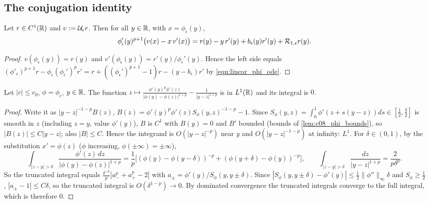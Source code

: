 \subsection{The conjugation identity}

\begin{lemma}
  \label{lem:c08_conj_local}
  Let $r\in C^1(\mathbb{R})$ and $v:=\mathcal{U}_\epsilon r$. Then for all $y\in\mathbb{R}$, with $x=\phi_\epsilon(y)$,
  \[
    \phi_\epsilon'(y)^{p+1}\bigl(v(x)-x\,v'(x)\bigr)=r(y)-y\,r'(y)+b_\epsilon(y)r'(y)+\mathcal{R}_{1,\epsilon}r(y).
  \]
\end{lemma}
\begin{proof}
  $v(\phi_\epsilon(y))=r(y)$ and $v'(\phi_\epsilon(y))=r'(y)/\phi_\epsilon'(y)$. Hence the left side equals
  $(\phi'_\epsilon)^{p+1}r-\phi_\epsilon(\phi_\epsilon')^pr'=r+((\phi_\epsilon')^{p+1}-1)r-(y-b_\epsilon)r'$ by
  \eqref{eqn:linear_phi_ode}.
\end{proof}

\begin{lemma}
  \label{lem:c08_conj_cancellation}
  Let $|c|\le c_0$, $\phi=\phi_c$, $y\in\mathbb{R}$. The function
  $z\mapsto\frac{\phi'(y)^p\phi'(z)}{|\phi(y)-\phi(z)|^{1+p}}-\frac1{|y-z|^{1+p}}$ is in $L^1(\mathbb{R})$ and its integral is $0$.
\end{lemma}
\begin{proof}
  Write it as $|y-z|^{-1-p}B(z)$, $B(z)=\phi'(y)^p\phi'(z)S_\phi(y,z)^{-1-p}-1$. Since
  $S_\phi(y,z)=\int_0^1\phi'(z+s(y-z))ds\in[\frac12,\frac32]$ is smooth in $z$ (including $z=y$, value $\phi'(y)$),
  $B$ is $C^1$ with $B(y)=0$ and $B'$ bounded (bounds of \cref{lem:c08_phi_bounds}), so $|B(z)|\le C|y-z|$;
  also $|B|\le C$. Hence the integrand is $O(|y-z|^{-p})$ near $y$ and $O(|y-z|^{-1-p})$ at infinity: $L^1$.
  For $\delta\in(0,1)$, by the substitution $x'=\phi(z)$ ($\phi$ increasing, $\phi(\pm\infty)=\pm\infty$),
  \[
    \int_{|z-y|>\delta}\frac{\phi'(z)\,dz}{|\phi(y)-\phi(z)|^{1+p}}=\frac1p\bigl[(\phi(y)-\phi(y-\delta))^{-p}+(\phi(y+\delta)-\phi(y))^{-p}\bigr],
    \qquad \int_{|z-y|>\delta}\frac{dz}{|y-z|^{1+p}}=\frac2{p\delta^p}.
  \]
  So the truncated integral equals $\frac{\delta^{-p}}p\bigl[a_-^p+a_+^p-2\bigr]$ with
  $a_\pm=\phi'(y)/S_\phi(y,y\pm\delta)$. Since $|S_\phi(y,y\pm\delta)-\phi'(y)|\le\frac12\|\phi''\|_\infty\delta$ and
  $S_\phi\ge\frac12$, $|a_\pm-1|\le C\delta$, so the truncated integral is $O(\delta^{1-p})\to0$. By dominated
  convergence the truncated integrals converge to the full integral, which is therefore $0$.
\end{proof}

